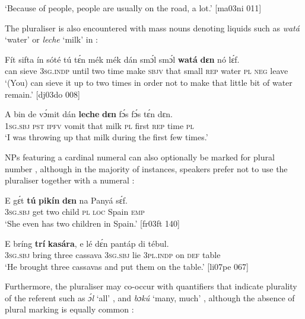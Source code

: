 \glt ‘Because of people, people are usually on the road, a lot.’ [ma03ni 011]
\z

The pluraliser is also encountered with mass nouns denoting liquids such as \textit{watá} ‘water’  or \textit{leche} ‘milk’ in :


\ea%
    \label{ex:key:209}
    \gll Fít  sifta    ín    sóté    tú  tɛ́n    mék    mék  
dán  smɔ́l  smɔ́l  \textbf{watá}  \textbf{dɛn}  nó  lɛ́f.\\
can  sieve  \textsc{3sg.indp}  until  two  time    make  \textsc{sbjv}
that  small  \textsc{rep}    water  \textsc{pl}  \textsc{neg}  leave\\

\glt ‘(You) can sieve it up to two times in order not to make that 
little bit of water remain.’ [dj03do 008]
\z


\ea%
    \label{ex:key:210}
    \gll A    bin  de  vɔ́mit  dán  \textbf{leche}  \textbf{dɛn}  fɔ́s  fɔ́s  tɛ́n    dɛn.\\
\textsc{1sg.sbj}  \textsc{pst}  \textsc{ipfv}  vomit  that  milk    \textsc{pl}  first \textsc{rep}  time    \textsc{pl}\\
\glt ‘I was throwing up that milk during the first few times.’\textstylePichiglossZchn{ [ed03sp 104]}
\z

NPs featuring a cardinal numeral can also optionally be marked for plural number , although in the majority of instances, speakers prefer not to use the pluraliser together with a numeral : 


\ea%
    \label{ex:key:211}
    \gll E    gɛ́t  \textbf{tú}  \textbf{pikín}  \textbf{dɛn}  na  Panyá  sɛ́f.\\
\textsc{3sg.sbj}  get  two  child  \textsc{pl}  \textsc{loc}  Spain  \textsc{emp}\\

\glt ‘She even has two children in Spain.’ [fr03ft 140]
\z


\ea%
    \label{ex:key:212}
    \gll E    bríng  \textbf{trí}    \textbf{kasára},  e    lé  dɛ́n    pantáp  di  tébul.\\
\textsc{3sg.sbj}  bring  three  cassava  \textsc{3sg.sbj}  lie  \textsc{3pl.indp}  on    \textsc{def}  table\\

\glt ‘He brought three cassavas and put them on the table.’ [li07pe 067]
\z

Furthermore, the pluraliser may co-occur with quantifiers that indicate plurality of the referent such as \textit{ɔ́l} ‘all’ , and \textit{bɔkú} ‘many, much’ , although the absence of plural marking is equally common : 


